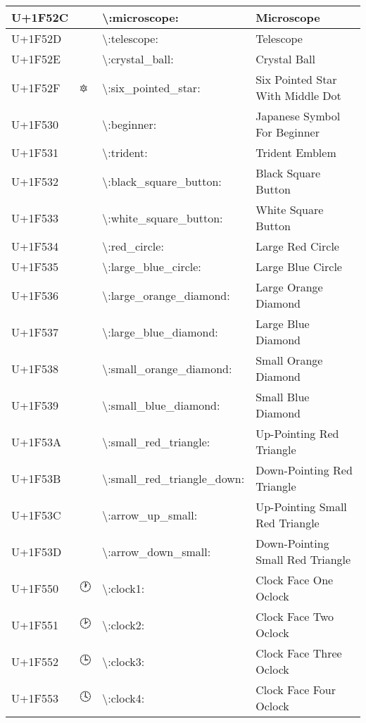 \begin{table}[h]
\begin{tabulary}{\linewidth}{|L|L|L|L|}
\hline
U+1F52C & 🔬 & {\textbackslash}:microscope: & Microscope \\
\hline
U+1F52D & 🔭 & {\textbackslash}:telescope: & Telescope \\
\hline
U+1F52E & 🔮 & {\textbackslash}:crystal\_ball: & Crystal Ball \\
\hline
U+1F52F & 🔯 & {\textbackslash}:six\_pointed\_star: & Six Pointed Star With Middle Dot \\
\hline
U+1F530 & 🔰 & {\textbackslash}:beginner: & Japanese Symbol For Beginner \\
\hline
U+1F531 & 🔱 & {\textbackslash}:trident: & Trident Emblem \\
\hline
U+1F532 & 🔲 & {\textbackslash}:black\_square\_button: & Black Square Button \\
\hline
U+1F533 & 🔳 & {\textbackslash}:white\_square\_button: & White Square Button \\
\hline
U+1F534 & 🔴 & {\textbackslash}:red\_circle: & Large Red Circle \\
\hline
U+1F535 & 🔵 & {\textbackslash}:large\_blue\_circle: & Large Blue Circle \\
\hline
U+1F536 & 🔶 & {\textbackslash}:large\_orange\_diamond: & Large Orange Diamond \\
\hline
U+1F537 & 🔷 & {\textbackslash}:large\_blue\_diamond: & Large Blue Diamond \\
\hline
U+1F538 & 🔸 & {\textbackslash}:small\_orange\_diamond: & Small Orange Diamond \\
\hline
U+1F539 & 🔹 & {\textbackslash}:small\_blue\_diamond: & Small Blue Diamond \\
\hline
U+1F53A & 🔺 & {\textbackslash}:small\_red\_triangle: & Up-Pointing Red Triangle \\
\hline
U+1F53B & 🔻 & {\textbackslash}:small\_red\_triangle\_down: & Down-Pointing Red Triangle \\
\hline
U+1F53C & 🔼 & {\textbackslash}:arrow\_up\_small: & Up-Pointing Small Red Triangle \\
\hline
U+1F53D & 🔽 & {\textbackslash}:arrow\_down\_small: & Down-Pointing Small Red Triangle \\
\hline
U+1F550 & 🕐 & {\textbackslash}:clock1: & Clock Face One Oclock \\
\hline
U+1F551 & 🕑 & {\textbackslash}:clock2: & Clock Face Two Oclock \\
\hline
U+1F552 & 🕒 & {\textbackslash}:clock3: & Clock Face Three Oclock \\
\hline
U+1F553 & 🕓 & {\textbackslash}:clock4: & Clock Face Four Oclock \\

\end{tabulary}
\end{table}
